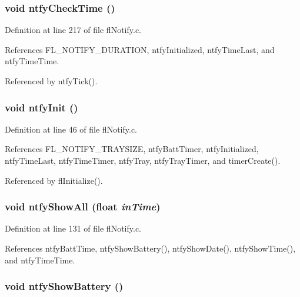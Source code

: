 \subsubsection{\setlength{\rightskip}{0pt plus 5cm}void ntfy\-Check\-Time ()}\label{flNotify_8c_a63e049aa2dbb4902b6f0d3363e5a8b7}




Definition at line 217 of file fl\-Notify.c.

References FL\_\-NOTIFY\_\-DURATION, ntfy\-Initialized, ntfy\-Time\-Last, and ntfy\-Time\-Time.

Referenced by ntfy\-Tick().
\subsubsection{\setlength{\rightskip}{0pt plus 5cm}void ntfy\-Init ()}\label{flNotify_8c_7c77f61ed638b2fc959277c5cf301a0a}




Definition at line 46 of file fl\-Notify.c.

References FL\_\-NOTIFY\_\-TRAYSIZE, ntfy\-Batt\-Timer, ntfy\-Initialized, ntfy\-Time\-Last, ntfy\-Time\-Timer, ntfy\-Tray, ntfy\-Tray\-Timer, and timer\-Create().

Referenced by fl\-Initialize().
\subsubsection{\setlength{\rightskip}{0pt plus 5cm}void ntfy\-Show\-All (float {\em in\-Time})}\label{flNotify_8c_7a3d59ce781288cef7644451105d6715}




Definition at line 131 of file fl\-Notify.c.

References ntfy\-Batt\-Time, ntfy\-Show\-Battery(), ntfy\-Show\-Date(), ntfy\-Show\-Time(), and ntfy\-Time\-Time.
\subsubsection{\setlength{\rightskip}{0pt plus 5cm}void ntfy\-Show\-Battery ()}\label{flNotify_8c_4dc9a519cd973d1b8f9672d709f7471e}




